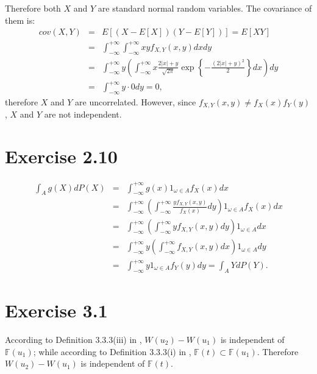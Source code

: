 \documentclass[final,3p,authoryear]{elsarticle}
\begin{document}
	Therefore both $X$ and $Y$ are standard normal random variables. The covariance of them is:
	\begin{eqnarray}
		cov(X,Y) &=& E[\left(X-E[X]\right)\left(Y-E[Y]\right)] = E[XY] \nonumber\\
		&=& \int_{-\infty}^{+\infty} \int_{-\infty}^{+\infty} xy f_{X,Y}(x,y) dx dy \nonumber\\
		&=& \int_{-\infty}^{+\infty} y \left( \int_{-\infty}^{+\infty} x \frac{2\left|x\right|+y}{\sqrt{2\pi}} \exp\left\{-\frac{\left(2\left|x\right|+y\right)^2}{2}\right\} dx \right) dy \nonumber\\
		&=& \int_{-\infty}^{+\infty} y \cdot 0 dy =0
		,
	\end{eqnarray}
	therefore $X$ and $Y$ are uncorrelated. However, since $f_{X,Y}(x,y) \neq f_X(x) f_Y(y)$, $X$ and $Y$ are not independent.
	
\section{Exercise 2.10}
	\begin{eqnarray}
		\int_{A} g(X) dP(X) &=& \int_{-\infty}^{+\infty} g(x) 1_{\omega \in A} f_X(x) dx \nonumber\\
		&=& \int_{-\infty}^{+\infty} \left( \int_{-\infty}^{+\infty} \frac{y f_{X,Y}(x,y)}{f_{X}(x)} dy \right) 1_{\omega \in A} f_X(x) dx \nonumber\\
		&=& \int_{-\infty}^{+\infty} \left( \int_{-\infty}^{+\infty} y f_{X,Y}(x,y) dy \right) 1_{\omega \in A} dx \nonumber\\
		&=& \int_{-\infty}^{+\infty} y \left( \int_{-\infty}^{+\infty} f_{X,Y}(x,y) dx \right) 1_{\omega \in A} dy \nonumber\\
		&=& \int_{-\infty}^{+\infty} y 1_{\omega \in A} f_Y(y) dy = \int_{A} Y dP(Y)
		.
	\end{eqnarray}

\section{Exercise 3.1}
	According to Definition 3.3.3(iii) in \citet{shreve2004stochastic}, $W(u_2)-W(u_1)$ is independent of $\mathbb{F}(u_1)$; while according to Definition 3.3.3(i) in \citet{shreve2004stochastic}, $\mathbb{F}(t) \subset \mathbb{F}(u_1)$. Therefore $W(u_2)-W(u_1)$ is independent of $\mathbb{F}(t)$.
	
\end{document}
